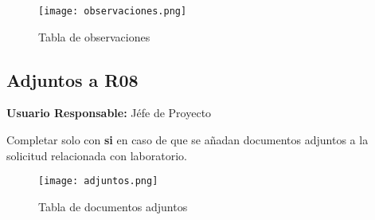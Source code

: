 \begin{landscape}
\begin{figure}
	\centering
	\texttt{[image: observaciones.png]}
	\caption{Tabla de observaciones}
	\label{observaciones}
\end{figure}
\end{landscape}

\subsection{Adjuntos a R08} 

\textbf{Usuario Responsable:} Jéfe de Proyecto

Completar solo con \textbf{si} en caso de que se añadan documentos adjuntos a la solicitud relacionada con laboratorio.

\begin{figure}
	\centering
	\texttt{[image: adjuntos.png]}
	\caption{Tabla de documentos adjuntos}
	\label{adjuntos}
\end{figure}